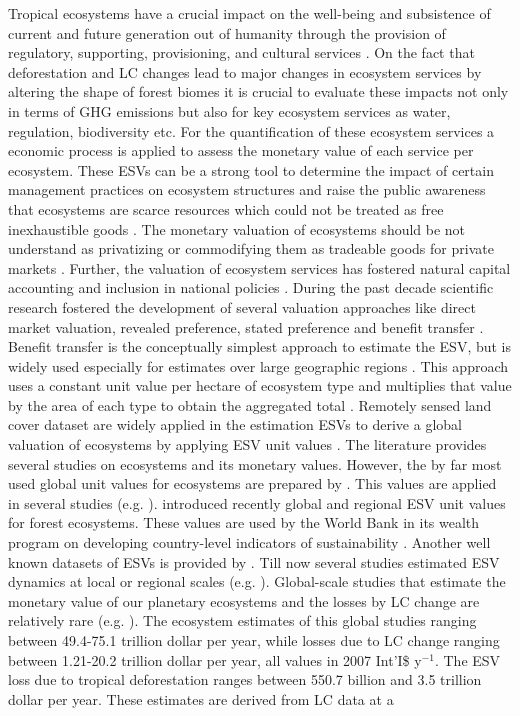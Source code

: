 	Tropical ecosystems have a crucial impact on the well-being and subsistence of current and future generation out of humanity through the provision of regulatory, supporting, provisioning, and cultural services \citep{Costanza1997}. On the fact that deforestation and \ac{LC} changes lead to major changes in ecosystem services by altering the shape of forest biomes it is crucial to evaluate these impacts not only in terms of \ac{GHG} emissions but also for key ecosystem services as water, regulation, biodiversity etc. For the quantification of these ecosystem services a economic process is applied to assess the monetary value of each service per ecosystem. These \acp{ESV} can be a strong tool to determine the impact of certain management practices on ecosystem structures and raise the public awareness that ecosystems are scarce resources which could not be treated as free inexhaustible goods \citep{Groot2012}. The monetary valuation of ecosystems should be not understand as privatizing or commodifying them as tradeable goods for private markets \citep{Costanza2014,Song2018}. Further, the valuation of ecosystem services has fostered natural capital accounting and inclusion in national policies \citep{Song2018}. During the past decade scientific research fostered the development of several valuation approaches like direct market valuation, revealed preference, stated preference and benefit transfer \citep{Song2018}. Benefit transfer is the conceptually simplest approach to estimate the \ac{ESV}, but is widely used especially for estimates over large geographic regions \citep{Costanza1997,Song2018,Costanza2014}. This approach uses a constant unit value per hectare of ecosystem type and multiplies that value by the area of each type to obtain the aggregated total \citep{Costanza2014}. Remotely sensed land cover dataset are widely applied in the estimation \acp{ESV} to derive a global valuation of ecosystems by applying \ac{ESV} unit values \citep{Song2018}. The literature provides several studies on ecosystems and its monetary values. However, the by far most used global unit values for ecosystems are prepared by \citeauthor{Costanza2014}. This values are applied in several studies (e.g. \citet{Costanza2014,Song2018,Sannigrahi2018,Kreuter2001,Wang2006,Zhao2004}). \citet{Siikamaki2015} introduced recently global and regional \ac{ESV} unit values for forest ecosystems. These values are used by the World Bank in its wealth program on developing country-level indicators of sustainability \citep{Siikamaki2015}. Another well known datasets of \acp{ESV} is provided by \citet{Groot2012}. Till now several studies estimated \ac{ESV} dynamics at local or regional scales (e.g. \citet{Kreuter2001,Wang2006,Zhao2004}). Global-scale studies that estimate the monetary value of our planetary ecosystems and the losses by \ac{LC} change are relatively rare (e.g. \citet{Costanza1997,Costanza2014,Sannigrahi2018,Song2018}). The ecosystem estimates of this global studies ranging between 49.4-75.1 trillion dollar per year, while losses due to \ac{LC} change ranging between 1.21-20.2 trillion dollar per year, all values in 2007 Int'I\$ y$^{-1}$. The \ac{ESV} loss due to tropical deforestation ranges between 550.7 billion and 3.5 trillion dollar per year. These estimates are derived from \ac{LC} data at a 